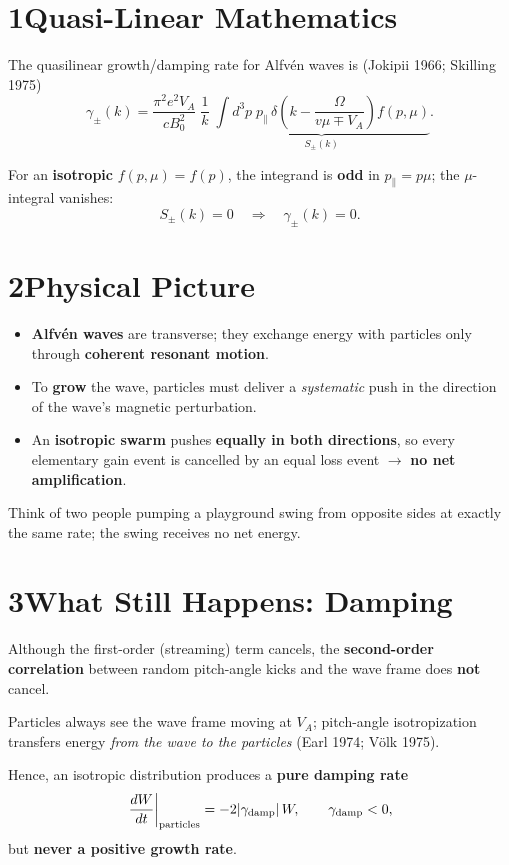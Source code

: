 \section*{1\quad Quasi-Linear Mathematics}

The quasilinear growth/damping rate for Alfvén waves is (Jokipii 1966; Skilling 1975)
\[
\gamma_\pm(k) =
\frac{\pi^2 e^2 V_A}{c B_0^2}\;
\frac{1}{k}\;
\underbrace{\int d^3p\;p_\parallel\,
\delta\!\left(k - \frac{\Omega}{v\mu \mp V_A}\right)
f(p,\mu)}_{S_\pm(k)}.
\]

For an \textbf{isotropic} $f(p,\mu) = f(p)$, the integrand is \textbf{odd} in $p_\parallel = p\mu$; the $\mu$-integral vanishes:
\[
S_\pm(k) = 0 \quad\Longrightarrow\quad \boxed{\gamma_\pm(k) = 0}.
\]

\section*{2\quad Physical Picture}

\begin{itemize}
\item \textbf{Alfvén waves} are transverse; they exchange energy with particles only through \textbf{coherent resonant motion}.
\item To \textbf{grow} the wave, particles must deliver a \textit{systematic} push in the direction of the wave’s magnetic perturbation.
\item An \textbf{isotropic swarm} pushes \textbf{equally in both directions}, so every elementary gain event is cancelled by an equal loss event $\rightarrow$ \textbf{no net amplification}.
\end{itemize}

\noindent Think of two people pumping a playground swing from opposite sides at exactly the same rate; the swing receives no net energy.

\section*{3\quad What Still Happens: Damping}

Although the first-order (streaming) term cancels, the \textbf{second-order correlation} between random pitch-angle kicks and the wave frame does \textbf{not} cancel.

Particles always see the wave frame moving at $V_A$; pitch-angle isotropization transfers energy \textit{from the wave to the particles} (Earl 1974; Völk 1975).

Hence, an isotropic distribution produces a \textbf{pure damping rate}
\[
\left.\frac{dW}{dt}\right|_{\text{particles}} = -2|\gamma_{\rm damp}|\,W,
\qquad \gamma_{\rm damp} < 0,
\]
but \textbf{never a positive growth rate}.

